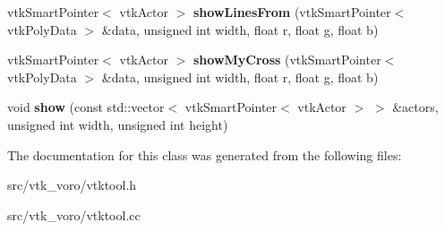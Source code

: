 \begin{DoxyCompactItemize}
\item 
vtk\+Smart\+Pointer$<$ vtk\+Actor $>$ {\bfseries show\+Lines\+From} (vtk\+Smart\+Pointer$<$ vtk\+Poly\+Data $>$ \&data, unsigned int width, float r, float g, float b)\hypertarget{classvtktool_1_1VTK_a7ce2964434d545cf939bc370c5072f3a}{}\label{classvtktool_1_1VTK_a7ce2964434d545cf939bc370c5072f3a}

\item 
vtk\+Smart\+Pointer$<$ vtk\+Actor $>$ {\bfseries show\+My\+Cross} (vtk\+Smart\+Pointer$<$ vtk\+Poly\+Data $>$ \&data, unsigned int width, float r, float g, float b)\hypertarget{classvtktool_1_1VTK_a20e04482f9eafdf4cb00b9ea941b5c67}{}\label{classvtktool_1_1VTK_a20e04482f9eafdf4cb00b9ea941b5c67}

\item 
void {\bfseries show} (const std\+::vector$<$ vtk\+Smart\+Pointer$<$ vtk\+Actor $>$ $>$ \&actors, unsigned int width, unsigned int height)\hypertarget{classvtktool_1_1VTK_a19b186188f0f995046ef146577452a50}{}\label{classvtktool_1_1VTK_a19b186188f0f995046ef146577452a50}

\end{DoxyCompactItemize}


The documentation for this class was generated from the following files\+:\begin{DoxyCompactItemize}
\item 
src/vtk\+\_\+voro/vtktool.\+h\item 
src/vtk\+\_\+voro/vtktool.\+cc\end{DoxyCompactItemize}
